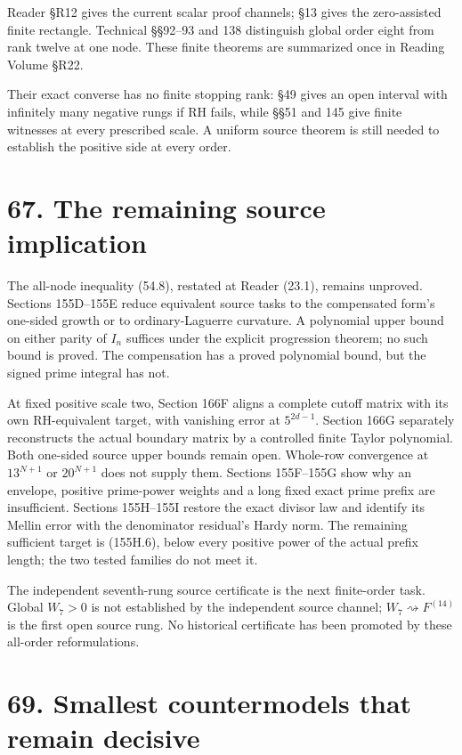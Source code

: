 \documentclass[
  11pt,
]{book}
\begin{document}
Reader §R12 gives the current scalar proof channels; §13 gives the
zero-assisted finite rectangle. Technical §§92--93 and 138 distinguish
global order eight from rank twelve at one node. These finite theorems
are summarized once in Reading Volume §R22.

Their exact converse has no finite stopping rank: §49 gives an open
interval with infinitely many negative rungs if RH fails, while §§51 and
145 give finite witnesses at every prescribed scale. A uniform source
theorem is still needed to establish the positive side at every order.

\section{67. The remaining source
implication}\label{the-remaining-source-implication}

The all-node inequality (54.8), restated at Reader (23.1), remains
unproved. Sections 155D--155E reduce equivalent source tasks to the
compensated form's one-sided growth or to ordinary-Laguerre curvature. A
polynomial upper bound on either parity of \(I_n\) suffices under the
explicit progression theorem; no such bound is proved. The compensation
has a proved polynomial bound, but the signed prime integral has not.

At fixed positive scale two, Section 166F aligns a complete cutoff
matrix with its own RH-equivalent target, with vanishing error at
\(5^{2d-1}\). Section 166G separately reconstructs the actual boundary
matrix by a controlled finite Taylor polynomial. Both one-sided source
upper bounds remain open. Whole-row convergence at \(13^{N+1}\) or
\(20^{N+1}\) does not supply them. Sections 155F--155G show why an
envelope, positive prime-power weights and a long fixed exact prime
prefix are insufficient. Sections 155H--155I restore the exact divisor
law and identify its Mellin error with the denominator residual's Hardy
norm. The remaining sufficient target is (155H.6), below every positive
power of the actual prefix length; the two tested families do not meet
it.

The independent seventh-rung source certificate is the next finite-order
task. Global \(W_7>0\) is not established by the independent source
channel; \(W_7\rightsquigarrow F^{(14)}\) is the first open source rung.
No historical certificate has been promoted by these all-order
reformulations.

\section{69. Smallest countermodels that remain
decisive}\label{smallest-countermodels-that-remain-decisive}
\end{document}

